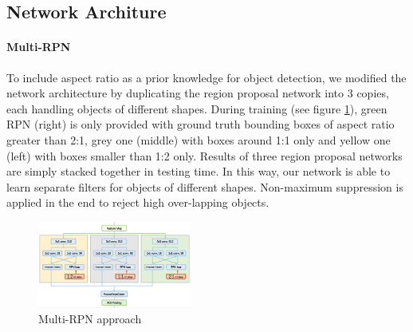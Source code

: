 \documentclass[10pt,twocolumn,letterpaper]{article}
\begin{document}
\subsection{Network Architure}
\paragraph{Multi-RPN}
To include aspect ratio as a prior knowledge for object detection, we modified the network architecture by duplicating the region proposal network into 3 copies, each handling objects of different shapes. During training (see figure \ref{ARS_De}), green RPN (right) is only provided with ground truth bounding boxes of aspect ratio greater than 2:1, grey one (middle) with boxes around 1:1 only and yellow one (left) with boxes smaller than 1:2 only. Results of three region proposal networks are simply stacked together in testing time. In this way, our network is able to learn separate filters for objects of different shapes. Non-maximum suppression is applied in the end to reject high over-lapping objects. 
    \begin{figure}[!htb]
    \includegraphics[width= 0.45\textwidth]{pic/ARS-archi-detail.png}
    \caption{Multi-RPN approach}
    \label{ARS_De}
    \end{figure}
\end{document}
